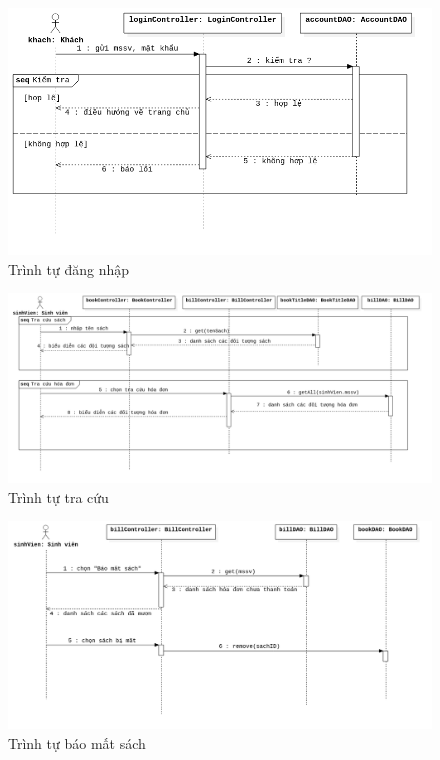

\begin{figure}[H]
\centering
\includegraphics[width=15cm]{figures/dangnhapseq.png}
\caption{Trình tự đăng nhập}
\end{figure}

\begin{figure}[H]
\centering
\includegraphics[width=\textwidth]{figures/tracuuseq.png}
\caption{Trình tự tra cứu}
\end{figure}

\begin{figure}[H]
\centering
\includegraphics[width=\textwidth]{figures/baomatsachseq.png}
\caption{Trình tự báo mất sách}
\end{figure}

